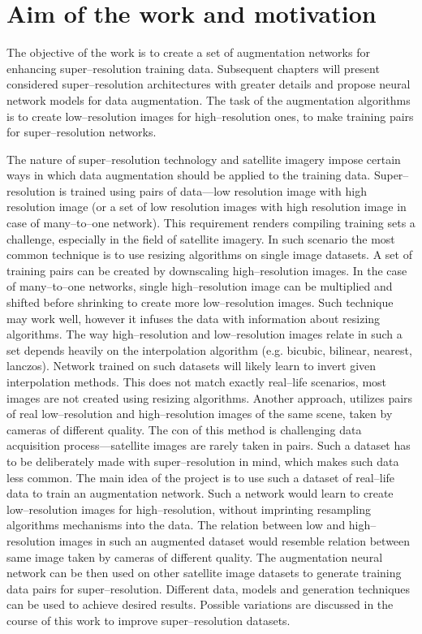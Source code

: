 \section{Aim of the work and motivation}
The objective of the work is to create a set of augmentation networks for
enhancing super--resolution training data.
Subsequent chapters will present considered super--resolution architectures
with greater details and propose neural network models for data augmentation.
The task of the augmentation algorithms is to create low--resolution images for
high--resolution ones, to make training pairs for super--resolution networks. 

The nature of super--resolution technology and satellite imagery impose certain
ways in which data augmentation should be applied to the training data.
Super--resolution is trained using pairs of data---low resolution image with
high resolution image (or a set of low resolution images with high resolution
image in case of many--to--one network).
This requirement renders compiling training sets a challenge, especially in the
field of satellite imagery.
In such scenario the most common technique is to use resizing algorithms on
single image datasets.
A set of training pairs can be created by downscaling high--resolution images.
In the case of many--to--one networks, single high--resolution image can be
multiplied and shifted before shrinking to create more low--resolution images.
Such technique may work well, however it infuses the data with information
about resizing algorithms.
The way high--resolution and low--resolution images relate in such a set
depends heavily on the interpolation algorithm (e.g. bicubic, bilinear,
nearest, lanczos).
Network trained on such datasets will likely learn to invert given
interpolation methods.
This does not match exactly real--life scenarios, most images are not created
using resizing algorithms.
Another approach, utilizes pairs of real low--resolution and high--resolution
images of the same scene, taken by cameras of different quality.
The con of this method is challenging data acquisition process---satellite
images are rarely taken in pairs.
Such a dataset has to be deliberately made with super--resolution in mind,
which makes such data less common.
The main idea of the project is to use such a dataset of real--life data to
train an augmentation network.
Such a network would learn to create low--resolution images for
high--resolution, without imprinting resampling algorithms mechanisms into the
data.
The relation between low and high--resolution images in such an augmented
dataset would resemble relation between same image taken by cameras of
different quality. 
The augmentation neural network can be then used on other satellite image
datasets to generate training data pairs for super--resolution.
Different data, models and generation techniques can be used to achieve desired
results.
Possible variations are discussed in the course of this work to improve
super--resolution datasets.